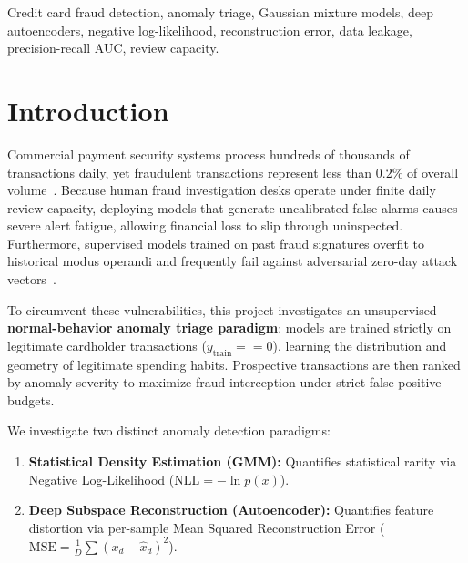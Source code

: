 \documentclass[conference]{IEEEtran}
\begin{document}
\begin{IEEEkeywords}
Credit card fraud detection, anomaly triage, Gaussian mixture models, deep autoencoders, negative log-likelihood, reconstruction error, data leakage, precision-recall AUC, review capacity.
\end{IEEEkeywords}

\section{Introduction}
Commercial payment security systems process hundreds of thousands of transactions daily, yet fraudulent transactions represent less than $0.2\%$ of overall volume~\cite{dalpozzolo2015}. Because human fraud investigation desks operate under finite daily review capacity, deploying models that generate uncalibrated false alarms causes severe alert fatigue, allowing financial loss to slip through uninspected. Furthermore, supervised models trained on past fraud signatures overfit to historical modus operandi and frequently fail against adversarial zero-day attack vectors~\cite{ahmed2016}.

To circumvent these vulnerabilities, this project investigates an unsupervised \textbf{normal-behavior anomaly triage paradigm}: models are trained strictly on legitimate cardholder transactions ($y_{\text{train}} == 0$), learning the distribution and geometry of legitimate spending habits. Prospective transactions are then ranked by anomaly severity to maximize fraud interception under strict false positive budgets.

We investigate two distinct anomaly detection paradigms:
\begin{enumerate}
    \item \textbf{Statistical Density Estimation (GMM):} Quantifies statistical rarity via Negative Log-Likelihood ($\text{NLL} = -\ln p(x)$).
    \item \textbf{Deep Subspace Reconstruction (Autoencoder):} Quantifies feature distortion via per-sample Mean Squared Reconstruction Error ($\text{MSE} = \frac{1}{D}\sum (x_d - \hat{x}_d)^2$).
\end{enumerate}
\end{document}
